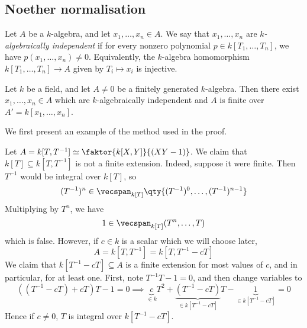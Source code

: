 \subsection{Noether normalisation}
\begin{definition}
    Let \( A \) be a \( k \)-algebra, and let \( x_1, \dots, x_n \in A \).
    We say that \( x_1, \dots, x_n \) are \emph{\( k \)-algebraically independent} if for every nonzero polynomial \( p \in k[T_1, \dots, T_n] \), we have \( p(x_1, \dots, x_n) \neq 0 \).
    Equivalently, the \( k \)-algebra homomorphism \( k[T_1, \dots, T_n] \to A \) given by \( T_i \mapsto x_i \) is injective.
\end{definition}
\begin{theorem}
    Let \( k \) be a field, and let \( A \neq 0 \) be a finitely generated \( k \)-algebra.
    Then there exist \( x_1, \dots, x_n \in A \) which are \( k \)-algebraically independent and \( A \) is finite over \( A' = k[x_1, \dots, x_n] \).
\end{theorem}
We first present an example of the method used in the proof.
\begin{example}
    Let \( A = k[T, T^{-1}] \simeq \faktor{k[X,Y]}{(XY - 1)} \).
    We claim that \( k[T] \subseteq k[T, T^{-1}] \) is not a finite extension.
    Indeed, suppose it were finite.
    Then \( T^{-1} \) would be integral over \( k[T] \), so
    \[ (T^{-1})^n \in \vecspan_{k[T]}\qty{(T^{-1})^0, \dots, (T^{-1})^{n-1}} \]
    Multiplying by \( T^n \), we have
    \[ 1 \in \vecspan_{k[T]}(T^n, \dots, T) \]
    which is false.
    However, if \( c \in k \) is a scalar which we will choose later,
    \[ A = k[T, T^{-1}] = k[T, T^{-1} - cT] \]
    We claim that \( k[T^{-1} - cT] \subseteq A \) is a finite extension for most values of \( c \), and in particular, for at least one.
    First, note \( T^{-1} T - 1 = 0 \), and then change variables to
    \[ ((T^{-1} - cT) + cT) T - 1 = 0 \implies \underbrace{c}_{\in k} T^2 + \underbrace{(T^{-1} - cT)}_{\in k[T^{-1} - cT]} T - \underbrace{1}_{\in k[T^{-1} - cT]} = 0 \]
    Hence if \( c \neq 0 \), \( T \) is integral over \( k[T^{-1} - cT] \).
\end{example}

